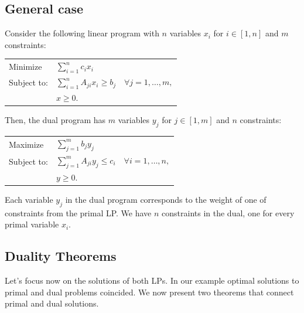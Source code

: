 \subsection{General case}

Consider the following linear program with $n$ variables $x_i$ for $i\in[1,n]$ and $m$
constraints:
\begin{center}
\begin{tabular}{ll}
  Minimize    & $\displaystyle\sum_{i=1}^n c_i x_i$\\[8pt]
  Subject to: & $\displaystyle\sum_{i=1}^n A_{ji}x_i\ge b_j\quad\forall j=1,\ldots,m,$\\[8pt]
              & $x\ge 0.$
\end{tabular}
\end{center}
Then, the dual program has $m$ variables $y_j$ for $j\in[1,m]$ and $n$ constraints:
\begin{center}
\begin{tabular}{ll}
  Maximize    & $\displaystyle\sum_{j=1}^m b_j y_j$\\[8pt]
  Subject to: & $\displaystyle\sum_{j=1}^m A_{ji}y_j\le c_i\quad\forall i=1,\ldots,n,$\\[8pt]
              & $y\ge 0.$
\end{tabular}
\end{center}
Each variable $y_j$ in the dual program corresponds to the weight of one of constraints from the
primal LP. We have $n$ constraints in the dual, one for every primal variable $x_i$.



\subsection{Duality Theorems}

Let's focus now on the solutions of both LPs. In our example optimal solutions to primal and dual
problems coincided. We now present two theorems that connect primal and dual solutions.
\label{thm:weak}

